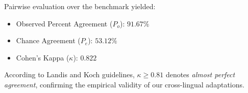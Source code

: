 Pairwise evaluation over the benchmark yielded:
\begin{itemize}
    \item Observed Percent Agreement ($P_o$): $91.67\%$
    \item Chance Agreement ($P_e$): $53.12\%$
    \item Cohen's Kappa ($\kappa$): $0.822$
\end{itemize}
According to Landis and Koch guidelines, $\kappa \ge 0.81$ denotes \textit{almost perfect agreement}, confirming the empirical validity of our cross-lingual adaptations.

